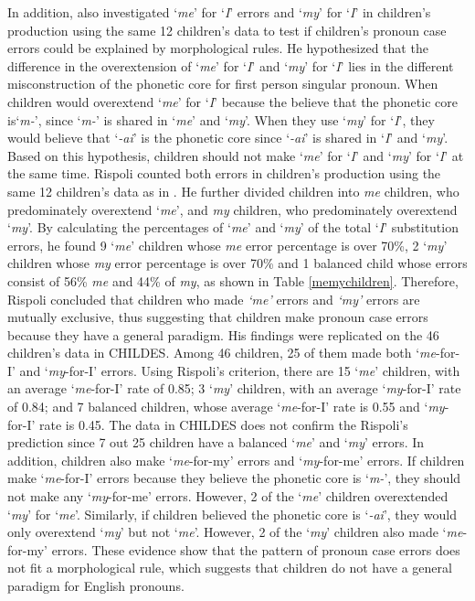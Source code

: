 In addition, \cite{rispoli1998} also investigated `\textit{me}' for `\textit{I}' errors and `\textit{my}' for `\textit{I}' in children's production using the same 12 children's data to test if children's pronoun case errors could be explained by morphological rules. He hypothesized that the difference in the overextension of `\textit{me}' for `\textit{I}' and `\textit{my}' for `\textit{I}' lies in the different misconstruction of the phonetic core for first person singular pronoun. When children would overextend `\textit{me}' for `\textit{I}' because the believe that the phonetic core is`\textit{m-}', since `\textit{m-}' is shared in `\textit{me}' and `\textit{my}'. When they use `\textit{my}' for `\textit{I}', they would believe that  `\textit{-ai}' is the phonetic core since `\textit{-ai}' is shared in `\textit{I}' and `\textit{my}'. Based on this hypothesis, children should not make `\textit{me}' for `\textit{I}' and `\textit{my}' for `\textit{I}' at the same time. Rispoli counted both errors in children's production using the same 12 children's data as in \cite{rispoli1994}. He further divided children into \textit{me} children, who predominately overextend `\textit{me}', and \textit{my} children, who predominately overextend `\textit{my}'. By calculating the percentages of `\textit{me}' and `\textit{my}' of the total `\textit{I}' substitution errors, he found 9 `\textit{me}' children whose \textit{me} error percentage is over 70\%, 2 `\textit{my}' children whose \textit{my} error percentage is over 70\% and 1 balanced child whose errors consist of 56\% \textit{me} and 44\% of \textit{my}, as shown in Table \ref{memychildren}. Therefore, Rispoli concluded that children who made \textit{`me'} errors and \textit{`my'} errors are mutually exclusive, thus suggesting that children make pronoun case errors because they have a general paradigm. His findings were replicated on the 46 children's data in CHILDES. Among 46 children, 25 of them made both `\textit{me}-for-I' and `\textit{my}-for-I' errors. Using Rispoli's criterion, there are 15 `\textit{me}' children, with an average `\textit{me}-for-I' rate of 0.85; 3 `\textit{my}' children, with an average `\textit{my}-for-I' rate of 0.84; and 7 balanced children, whose average `\textit{me}-for-I' rate is 0.55 and `\textit{my}-for-I' rate is 0.45. The data in CHILDES does not confirm the Rispoli's prediction since 7 out 25 children have a balanced `\textit{me}' and `\textit{my}' errors. In addition, children also make `\textit{me}-for-my' errors and `\textit{my}-for-me' errors. If children make `\textit{me}-for-I' errors because they believe the phonetic core is `\textit{m-}', they should not make any `\textit{my}-for-me' errors. However, 2 of the `\textit{me}' children overextended `\textit{my}' for `\textit{me}'. Similarly, if children believed the phonetic core is `\textit{-ai}', they would only overextend `\textit{my}' but not `\textit{me}'. However, 2 of the `\textit{my}' children also made `\textit{me}-for-my' errors. These evidence show that the pattern of pronoun case errors does not fit a morphological rule, which suggests that children do not have a general paradigm for English pronouns.  

